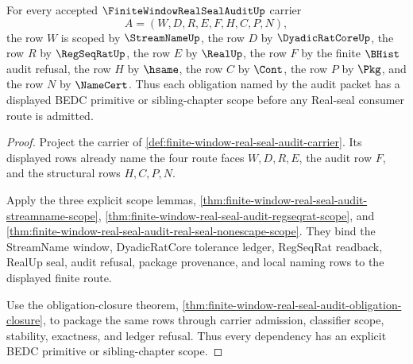 \begin{theorem}
\label{thm:finite-window-real-seal-audit-scoped-dependency}
For every accepted $\FiniteWindowRealSealAuditUp$ carrier
$$
A=(W,D,R,E,F,H,C,P,N),
$$
the row $W$ is scoped by $\StreamNameUp$, the row $D$ by $\DyadicRatCoreUp$, the row $R$ by $\RegSeqRatUp$, the row $E$ by $\RealUp$, the row $F$ by the finite $\BHist$ audit refusal, the row $H$ by $\hsame$, the row $C$ by $\Cont$, the row $P$ by $\Pkg$, and the row $N$ by $\NameCert$. Thus each obligation named by the audit packet has a displayed BEDC primitive or sibling-chapter scope before any Real-seal consumer route is admitted.
\end{theorem}
\begin{proof}
Project the carrier of \autoref{def:finite-window-real-seal-audit-carrier}. Its displayed rows already name the four route faces $W,D,R,E$, the audit row $F$, and the structural rows $H,C,P,N$.

Apply the three explicit scope lemmas, \autoref{thm:finite-window-real-seal-audit-streamname-scope}, \autoref{thm:finite-window-real-seal-audit-regseqrat-scope}, and \autoref{thm:finite-window-real-seal-audit-real-seal-nonescape-scope}. They bind the StreamName window, DyadicRatCore tolerance ledger, RegSeqRat readback, RealUp seal, audit refusal, package provenance, and local naming rows to the displayed finite route.

Use the obligation-closure theorem, \autoref{thm:finite-window-real-seal-audit-obligation-closure}, to package the same rows through carrier admission, classifier scope, stability, exactness, and ledger refusal. Thus every dependency has an explicit BEDC primitive or sibling-chapter scope.
\end{proof}

